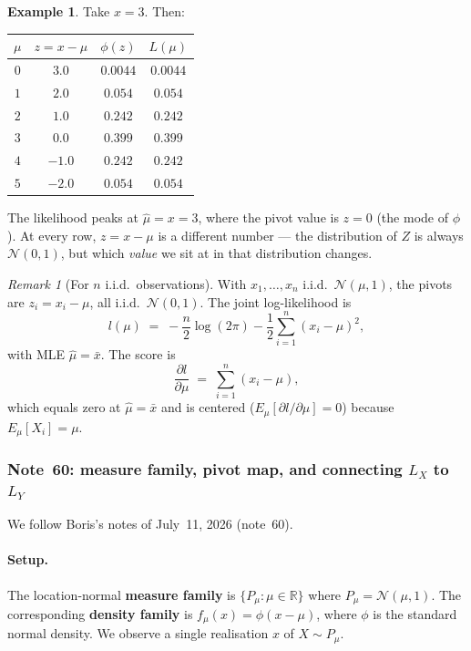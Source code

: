 \documentclass[a4paper,oneside,12pt]{extarticle}
\theoremstyle{plain}
\theoremstyle{definition}
\newtheorem{example}[proposition]{Example}
\theoremstyle{remark}
\newtheorem{remark}[proposition]{Remark}
\begin{document}
\begin{example}
Take $x = 3$.  Then:
\begin{center}
\small
\begin{tabular}{cccc}
\toprule
$\mu$ & $z = x - \mu$ & $\phi(z)$ & $L(\mu)$ \\
\midrule
$0$ & $3.0$ & $0.0044$ & $0.0044$ \\
$1$ & $2.0$ & $0.054$ & $0.054$ \\
$2$ & $1.0$ & $0.242$ & $0.242$ \\
$3$ & $0.0$ & $0.399$ & $0.399$ \\
$4$ & $-1.0$ & $0.242$ & $0.242$ \\
$5$ & $-2.0$ & $0.054$ & $0.054$ \\
\bottomrule
\end{tabular}
\end{center}
The likelihood peaks at $\hat\mu = x = 3$, where the pivot value
is $z = 0$ (the mode of $\phi$).  At every row, $z = x-\mu$ is a
different number — the distribution of $Z$ is always $\mathcal{N}(0,1)$,
but which \emph{value} we sit at in that distribution changes.
\end{example}

\begin{remark}[For $n$ i.i.d.\ observations]
With $x_1,\ldots,x_n$ i.i.d.\ $\mathcal{N}(\mu,1)$, the pivots are
$z_i = x_i - \mu$, all i.i.d.\ $\mathcal{N}(0,1)$.  The joint
log-likelihood is
\[
  l(\mu) \;=\; -\frac{n}{2}\log(2\pi) - \frac{1}{2}\sum_{i=1}^n (x_i-\mu)^2,
\]
with MLE $\hat\mu = \bar x$.  The score is
\[
  \frac{\partial l}{\partial\mu} \;=\; \sum_{i=1}^n (x_i - \mu),
\]
which equals zero at $\hat\mu = \bar x$ and is centered
($E_\mu[\partial l/\partial\mu] = 0$) because $E_\mu[X_i] = \mu$.
\end{remark}

\subsubsection*{Note~60: measure family, pivot map, and connecting $L_X$ to $L_Y$}

We follow Boris's notes of July~11, 2026 (note~60).

\paragraph{Setup.}
The location-normal \textbf{measure family} is
$\{P_\mu : \mu \in \mathbb{R}\}$ where
$P_\mu = \mathcal{N}(\mu, 1)$.
The corresponding \textbf{density family} is
$f_\mu(x) = \phi(x - \mu)$, where $\phi$ is the standard normal
density.  We observe a single realisation $x$ of $X \sim P_\mu$.
\end{document}
